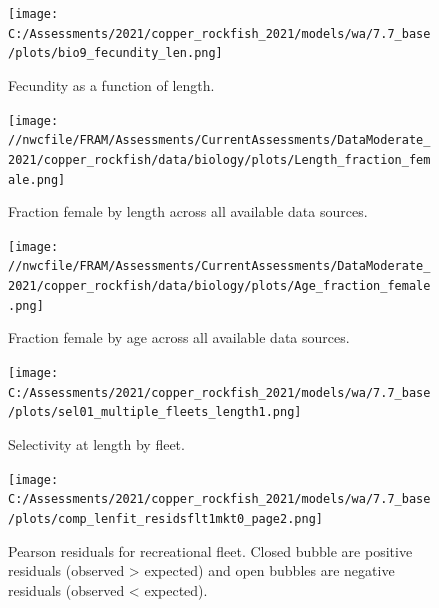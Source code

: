 \documentclass[11pt,
  english,
  a4paper,
]{article}
\begin{document}
\begin{figure}
\centering
\texttt{[image: C:/Assessments/2021/copper\_rockfish\_2021/models/wa/7.7\_base/plots/bio9\_fecundity\_len.png]}
\caption{Fecundity as a function of length.\label{fig:fecundity}}
\end{figure}

\tagmcend\tagstructend

\clearpage


\begin{figure}
\centering
\texttt{[image: //nwcfile/FRAM/Assessments/CurrentAssessments/DataModerate\_2021/copper\_rockfish/data/biology/plots/Length\_fraction\_female.png]}
\caption{Fraction female by length across all available data sources.\label{fig:len-sex-ratio}}
\end{figure}

\tagmcend\tagstructend


\begin{figure}
\centering
\texttt{[image: //nwcfile/FRAM/Assessments/CurrentAssessments/DataModerate\_2021/copper\_rockfish/data/biology/plots/Age\_fraction\_female.png]}
\caption{Fraction female by age across all available data sources.\label{fig:age-sex-ratio}}
\end{figure}

\tagmcend\tagstructend


\begin{figure}
\centering
\texttt{[image: C:/Assessments/2021/copper\_rockfish\_2021/models/wa/7.7\_base/plots/sel01\_multiple\_fleets\_length1.png]}
\caption{Selectivity at length by fleet.\label{fig:selex}}
\end{figure}

\tagmcend\tagstructend


\begin{figure}
\centering
\texttt{[image: C:/Assessments/2021/copper\_rockfish\_2021/models/wa/7.7\_base/plots/comp\_lenfit\_residsflt1mkt0\_page2.png]}
\caption{Pearson residuals for recreational fleet. Closed bubble are positive residuals (observed \textgreater{} expected) and open bubbles are negative residuals (observed \textless{} expected).\label{fig:rec-pearson}}
\end{figure}
\end{document}
